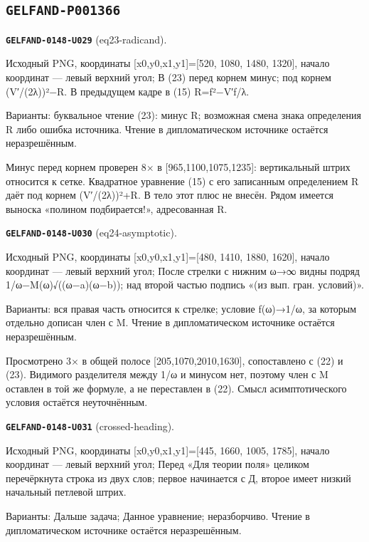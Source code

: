 \documentclass[11pt]{article}
\theoremstyle{definition}
\theoremstyle{remark}
\begin{document}
\subsection*{\texttt{GELFAND-P001366}}
\noindent\leavevmode{}\label{GELFAND-P001366:eq23-radicand:note}\textbf{\texttt{GELFAND-0148-U029}} (eq23-radicand).\par\nopagebreak[4]
Исходный PNG, координаты [x0,y0,x1,y1]=[520, 1080, 1480, 1320], начало координат — левый верхний угол; В (23) перед корнем минус; под корнем (V′/(2λ))²−R. В предыдущем кадре в (15) R=f²−V′f/λ.\par
Варианты: буквальное чтение (23): минус R; возможная смена знака определения R либо ошибка источника. Чтение в дипломатическом источнике остаётся неразрешённым.\par
Минус перед корнем проверен 8× в [965,1100,1075,1235]: вертикальный штрих относится к сетке. Квадратное уравнение (15) с его записанным определением R даёт под корнем (V′/(2λ))²+R. В тело этот плюс не внесён. Рядом имеется выноска «полином подбирается!», адресованная R.\par\medskip
\noindent\leavevmode{}\label{GELFAND-P001366:eq24-asymptotic:note}\textbf{\texttt{GELFAND-0148-U030}} (eq24-asymptotic).\par\nopagebreak[4]
Исходный PNG, координаты [x0,y0,x1,y1]=[480, 1410, 1880, 1620], начало координат — левый верхний угол; После стрелки с нижним ω→∞ видны подряд 1/ω−M(ω)√((ω−a)(ω−b)); над второй частью подпись «(из вып. гран. условий)».\par
Варианты: вся правая часть относится к стрелке; условие f(ω)→1/ω, за которым отдельно дописан член с M. Чтение в дипломатическом источнике остаётся неразрешённым.\par
Просмотрено 3× в общей полосе [205,1070,2010,1630], сопоставлено с (22) и (23). Видимого разделителя между 1/ω и минусом нет, поэтому член с M оставлен в той же формуле, а не переставлен в (22). Смысл асимптотического условия остаётся неуточнённым.\par\medskip
\noindent\leavevmode{}\label{GELFAND-P001366:crossed-heading:note}\textbf{\texttt{GELFAND-0148-U031}} (crossed-heading).\par\nopagebreak[4]
Исходный PNG, координаты [x0,y0,x1,y1]=[445, 1660, 1005, 1785], начало координат — левый верхний угол; Перед «Для теории поля» целиком перечёркнута строка из двух слов; первое начинается с Д, второе имеет низкий начальный петлевой штрих.\par
Варианты: Дальше задача; Данное уравнение; неразборчиво. Чтение в дипломатическом источнике остаётся неразрешённым.\par
\end{document}
